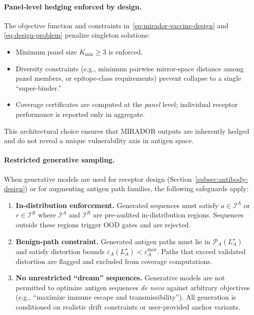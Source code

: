 \documentclass[11pt]{article}
\begin{document}
\paragraph{Panel-level hedging enforced by design.}
The objective function and constraints in~\eqref{eq:mirador-vaccine-design} and
\eqref{eq:design-problem} penalize singleton solutions:
\begin{itemize}
  \item Minimum panel size $K_{\min} \ge 3$ is enforced.
  \item Diversity constraints (e.g., minimum pairwise mirror-space distance among panel
        members, or epitope-class requirements) prevent collapse to a single ``super-binder.''
  \item Coverage certificates are computed at the \emph{panel} level; individual receptor
        performance is reported only in aggregate.
\end{itemize}
This architectural choice ensures that MIRADOR outputs are inherently hedged and do not reveal
a unique vulnerability axis in antigen space.

\paragraph{Restricted generative sampling.}
When generative models are used for receptor design (Section~\ref{subsec:antibody-design}) or
for augmenting antigen path families, the following safeguards apply:
\begin{enumerate}
  \item \textbf{In-distribution enforcement.}
  Generated sequences must satisfy $a \in \mathcal{I}^A$ or $r \in \mathcal{I}^R$ where
  $\mathcal{I}^A$ and $\mathcal{I}^R$ are pre-audited in-distribution regions. Sequences
  outside these regions trigger OOD gates and are rejected.

  \item \textbf{Benign-path constraint.}
  Generated antigen paths must lie in $\mathcal{P}_A(L_A^\star)$ and satisfy distortion bounds
  $\varepsilon_A(L_A^\star) < \varepsilon_A^{\max}$. Paths that exceed validated distortion are
  flagged and excluded from coverage computations.

  \item \textbf{No unrestricted ``dream'' sequences.}
  Generative models are not permitted to optimize antigen sequences \emph{de novo} against
  arbitrary objectives (e.g., ``maximize immune escape and transmissibility''). All generation
  is conditioned on realistic drift constraints or user-provided anchor variants.
\end{enumerate}
\end{document}
